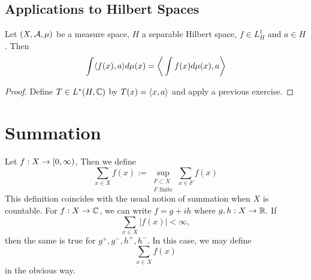 \documentclass{book}
\begin{document}
	
	
	
	
	
	
	
	
	
	
	
	\newpage
	\section{Applications to Hilbert Spaces}	
	
	\begin{ex}  
	Let $(X, \mathcal{A}, \mu)$ be a measure space, $H$ a separable Hilbert space, $f \in L^1_H$ and $a \in H$. Then $$\int \langle f(x), a \rangle d\mu(x) = \bigg \langle \int f(x) d \mu(x) , a\bigg \rangle$$ 
	\end{ex}	
	
	\begin{proof}
	Define $T \in L^*(H, \mathbb{C})$ by $T(x) = \langle x, a \rangle$ and apply a previous exercise.
	\end{proof}
	
	
	
	
	
	
	
	
	
	
	
	
	
	
	
	
	
	
	
	
	
	
	
	
	
	
	
	

	
	

	
	\appendix
	
	\chapter{Summation}
	
	\begin{defn}  
		Let $f:X \rightarrow [0,\infty)$, Then we define $$\sum_{x \in X} f(x) := \sup_{\substack{F \subset X \\ F \text{ finite}}} \sum_{x \in F} f(x)$$ This definition coincides with the usual notion of summation when $X$ is countable. For $f:X \rightarrow \mathbb{C}$, we can write $f = g +ih$ where $g,h:X \rightarrow \mathbb{R}$. If $$\sum_{x \in X}|f(x)| < \infty,$$ then the same is true for $g^+,g^-,h^+,h^-$. In this case, we may define $$\sum_{x \in X} f(x)$$ in the obvious way.
	\end{defn} 
	
\end{document}
